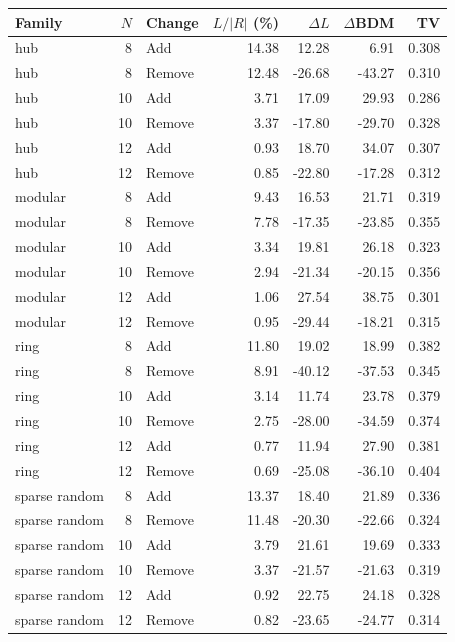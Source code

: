 \begin{tabular}{lrlrrrr}
\toprule
Family & $N$ & Change & $L/|R|$ (\%) & $\Delta L$ & $\Delta$BDM & TV \\
\midrule
hub & 8 & Add & 14.38 & 12.28 & 6.91 & 0.308 \\
hub & 8 & Remove & 12.48 & -26.68 & -43.27 & 0.310 \\
hub & 10 & Add & 3.71 & 17.09 & 29.93 & 0.286 \\
hub & 10 & Remove & 3.37 & -17.80 & -29.70 & 0.328 \\
hub & 12 & Add & 0.93 & 18.70 & 34.07 & 0.307 \\
hub & 12 & Remove & 0.85 & -22.80 & -17.28 & 0.312 \\
modular & 8 & Add & 9.43 & 16.53 & 21.71 & 0.319 \\
modular & 8 & Remove & 7.78 & -17.35 & -23.85 & 0.355 \\
modular & 10 & Add & 3.34 & 19.81 & 26.18 & 0.323 \\
modular & 10 & Remove & 2.94 & -21.34 & -20.15 & 0.356 \\
modular & 12 & Add & 1.06 & 27.54 & 38.75 & 0.301 \\
modular & 12 & Remove & 0.95 & -29.44 & -18.21 & 0.315 \\
ring & 8 & Add & 11.80 & 19.02 & 18.99 & 0.382 \\
ring & 8 & Remove & 8.91 & -40.12 & -37.53 & 0.345 \\
ring & 10 & Add & 3.14 & 11.74 & 23.78 & 0.379 \\
ring & 10 & Remove & 2.75 & -28.00 & -34.59 & 0.374 \\
ring & 12 & Add & 0.77 & 11.94 & 27.90 & 0.381 \\
ring & 12 & Remove & 0.69 & -25.08 & -36.10 & 0.404 \\
sparse random & 8 & Add & 13.37 & 18.40 & 21.89 & 0.336 \\
sparse random & 8 & Remove & 11.48 & -20.30 & -22.66 & 0.324 \\
sparse random & 10 & Add & 3.79 & 21.61 & 19.69 & 0.333 \\
sparse random & 10 & Remove & 3.37 & -21.57 & -21.63 & 0.319 \\
sparse random & 12 & Add & 0.92 & 22.75 & 24.18 & 0.328 \\
sparse random & 12 & Remove & 0.82 & -23.65 & -24.77 & 0.314 \\
\bottomrule
\end{tabular}
